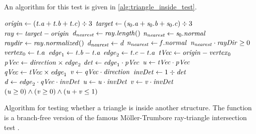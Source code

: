 An algorithm for this  test is given in \cref{alg:triangle_inside_test}.
%
\begin{algorithm}
	\centering
	\begin{algorithmic}[1]
			\State $\mathit{origin} \gets (\mathit{t}.\mathit{a} + \mathit{t}.\mathit{b} + \mathit{t}.\mathit{c}) \div 3$ 
			\State $\mathit{target} \gets (\mathit{s}_0.\mathit{a} + \mathit{s}_0.\mathit{b} + \mathit{s}_0.\mathit{c}) \div 3$ 
			\State $\mathit{ray} \gets \mathit{target} - \mathit{origin}$
			\State $\mathit{d}_{\mathit{nearest}} \gets \mathit{ray}.\mathit{length}()$
			\State $\mathit{n}_{\mathit{nearest}} \gets \mathit{s}_0.\mathit{normal}$
			\State $\mathit{raydir} \gets \mathit{ray}.\mathit{normalized}()$
			 
						\State $\mathit{d}_{\mathit{nearest}} \gets \mathit{d}$
						\State $\mathit{n}_{\mathit{nearest}} \gets \mathit{f}.\mathit{normal}$
					\EndIf
				\EndIf
			\EndFor
			\State \Return $\mathit{n}_{\mathit{nearest}} \cdot \mathit{rayDir} \geq 0$
		\EndFunction
		\\
			\State $\mathit{vertex}_0 \gets \mathit{t}.\mathit{a}$
			\State $\mathit{edge}_1 \gets \mathit{t}.\mathit{b} - \mathit{t}.\mathit{a}$
			\State $\mathit{edge}_2 \gets \mathit{t}.\mathit{c} - \mathit{t}.\mathit{a}$
			\State $\mathit{tVec} \gets \mathit{origin} - \mathit{vertex}_0$
			\State $\mathit{pVec} \gets \mathit{direction} \times \mathit{edge}_2$
			\State $\mathit{det} \gets \mathit{edge}_1 \cdot \mathit{pVec}$
			\State $\mathit{u} \gets \mathit{tVec} \cdot \mathit{pVec}$
			\State $\mathit{qVec} \gets \mathit{tVec} \times \mathit{edge}_1$
			\State $\mathit{v} \gets \mathit{qVec} \cdot \mathit{direction}$
			\State $\mathit{invDet} \gets 1 \div \mathit{det}$
			\State $\mathit{d} \gets \mathit{edge}_2 \cdot \mathit{qVec} \cdot \mathit{invDet}$
			\State $\mathit{u} \gets \mathit{u} \cdot \mathit{invDet}$
			\State $\mathit{v} \gets \mathit{v} \cdot \mathit{invDet}$
			\State \Return $(\mathit{u} \geq 0) \wedge (\mathit{v} \geq 0) \wedge (\mathit{u} + \mathit{v} \leq 1)$
		\EndFunction
	\end{algorithmic}
	\caption{
		Algorithm for testing whether a triangle is inside another structure.
		The  function is a branch-free version of the famous Möller-Trumbore ray-triangle intersection test \cite{ray_triangle_intersection_moller}.
	}
	\label{alg:triangle_inside_test}
\end{algorithm}
